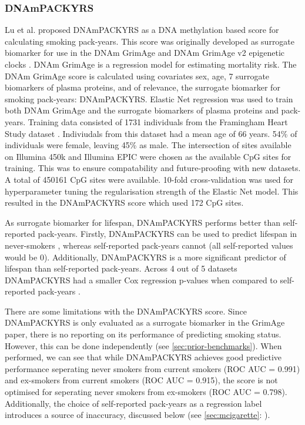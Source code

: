 \documentclass{article}
\begin{document}
\subsubsection{DNAmPACKYRS} \label{sec:dnampackyrs}
Lu et al. \cite{lu2019dna} proposed DNAmPACKYRS as a DNA methylation based score for calculating smoking pack-years. This score was originally developed as surrogate biomarker for use in the DNAm GrimAge and DNAm GrimAge v2 epigenetic clocks \cite{lu2019dna,lu2022dna}. DNAm GrimAge is a regression model for estimating mortality risk. The DNAm GrimAge score is calculated using covariates sex, age, 7 surrogate biomarkers of plasma proteins, and of relevance, the surrogate biomarker for smoking pack-years: DNAmPACKYRS. Elastic Net regression was used to train both DNAm GrimAge and the surrogate biomarkers of plasma proteins and pack-years. Training data consisted of 1731 individuals from the Framingham Heart Study dataset \cite{doi:10.2105/AJPH.41.3.279}. Indiviudals from this dataset had a mean age of 66 years. 54\% of individuals were female, leaving 45\% as male. The intersection of sites available on Illumina 450k and Illumina EPIC were chosen as the available CpG sites for training. This was to ensure compatability and future-proofing with new datasets. A total of \num{450161} CpG sites were available. 10-fold cross-validation was used for hyperparameter tuning the regularisation strength of the Elastic Net model. This resulted in the DNAmPACKYRS score which used 172 CpG sites.

As surrogate biomarker for lifespan, DNAmPACKYRS performs better than self-reported pack-years. Firstly, DNAmPACKYRS can be used to predict lifespan in never-smokers \cite{lu2019dna}, whereas self-reported pack-years cannot (all self-reported values would be 0). Additionally, DNAmPACKYRS is a more significant predictor of lifespan than self-reported pack-years. Across 4 out of 5 datasets DNAmPACKYRS had a smaller Cox regression p-values when compared to self-reported pack-years \cite{lu2019dna}.

There are some limitations with the DNAmPACKYRS score. Since DNAmPACKYRS is only evaluated as a surrogate biomarker in the GrimAge paper, there is no reporting on its performance of predicting smoking status. However, this can be done independently (see \ref{sec:prior-benchmarks}). When performed, we can see that while DNAmPACKYRS achieves good predictive performance seperating never smokers from current smokers (ROC AUC = 0.991) and ex-smokers from current smokers (ROC AUC = 0.915), the score is not optimised for seperating never smokers from ex-smokers (ROC AUC = 0.798). Additionally, the choice of self-reported pack-years as a regression label introduces a source of inaccuracy, discussed below (see \ref{sec:mcigarette}: ).
\end{document}

